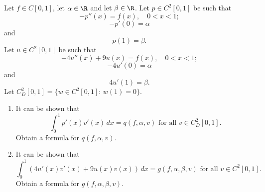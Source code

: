 
Let $f\in C[0,1]$, let $\alpha\in\R$ and let $\beta\in\R$. Let $p\in C^2[0,1]$ be such that
\[
-p''(x)=f(x),\quad 0<x<1;
\]
\[
-p'(0)=\alpha
\]
and
\[
p(1)=\beta.
\]
Let $u\in C^2[0,1]$ be such that
\[
-4u''(x)+9u(x)=f(x),\quad 0<x<1;
\]
\[
-4u'(0)=\alpha
\]
and
\[
4u'(1)=\beta.
\]
Let $C^2_D[0,1]=\{w\in C^2[0,1]:\,w(1)=0\}$.
\\
\begin{enumerate}
\item It can be shown that
\[
\int_0^1p'(x)v'(x)\,dx=q(f,\alpha,v)\mbox{ for all }v\in C^2_D[0,1].
\]
Obtain a formula for $q(f,\alpha,v)$.
\\
\item It can be shown that
\[
\int_0^1\left(4u'(x)v'(x)+9u(x)v(x)\right)\,dx=g(f,\alpha,\beta,v)\mbox{ for all }v\in C^2[0,1].
\]
Obtain a formula for $g(f,\alpha,\beta,v)$.
\end{enumerate}



